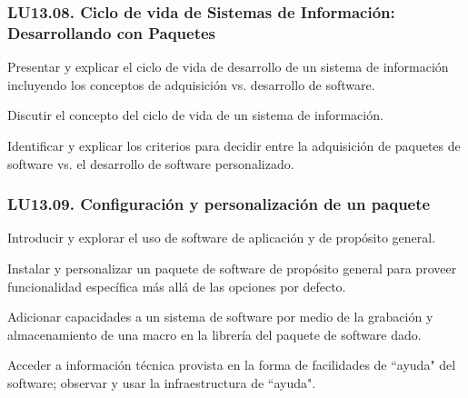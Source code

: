 \subsubsection{LU13.08. Ciclo de vida de Sistemas de Información: Desarrollando con Paquetes}\label{sec:BOK-LU13.08}\label{sec:LU13.08}
\begin{LearningUnit}
\begin{LUGoal}
\item Presentar y explicar el ciclo de vida de desarrollo de un sistema de información incluyendo los conceptos de adquisición vs. desarrollo de software.
\end{LUGoal}

\begin{LUObjective}
\item Discutir el concepto del ciclo de vida de un sistema de información.
\item Identificar y explicar los criterios para decidir entre la adquisición de paquetes de software vs. el desarrollo de software personalizado.
\end{LUObjective}
\end{LearningUnit}

\subsubsection{LU13.09. Configuración y personalización de un paquete}\label{sec:BOK-LU13.09}\label{sec:LU13.09}
\begin{LearningUnit}
\begin{LUGoal}
\item Introducir y explorar el uso de software de aplicación y de propósito general.
\end{LUGoal}

\begin{LUObjective}
\item Instalar y personalizar un paquete de software de propósito general para proveer funcionalidad específica más allá de las opciones por defecto.
\item Adicionar capacidades a un sistema de software por medio de la grabación y almacenamiento de una macro en la librería del paquete de software dado.
\item Acceder a información técnica provista en la forma de facilidades de ``ayuda" del software; observar y usar la infraestructura de ``ayuda".
\end{LUObjective}
\end{LearningUnit}

